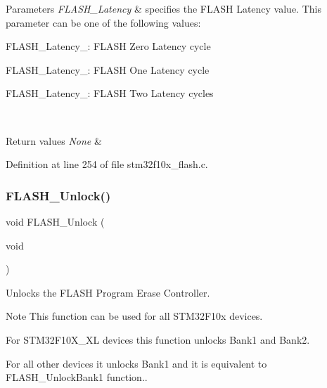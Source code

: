 \begin{DoxyParams}{Parameters}
{\em F\+L\+A\+S\+H\+\_\+\+Latency} & specifies the F\+L\+A\+SH Latency value. This parameter can be one of the following values\+: \begin{DoxyItemize}
\item F\+L\+A\+S\+H\+\_\+\+Latency\+\_\+: F\+L\+A\+SH Zero Latency cycle \item F\+L\+A\+S\+H\+\_\+\+Latency\+\_\+: F\+L\+A\+SH One Latency cycle \item F\+L\+A\+S\+H\+\_\+\+Latency\+\_\+: F\+L\+A\+SH Two Latency cycles \end{DoxyItemize}
\\
\hline
\end{DoxyParams}

\begin{DoxyRetVals}{Return values}
{\em None} & \\
\hline
\end{DoxyRetVals}


Definition at line 254 of file stm32f10x\+\_\+flash.\+c.

\mbox{\label{group___f_l_a_s_h___exported___functions_ga4084d0184bab463a1579271bf474aaef}} 
\subsubsection{\texorpdfstring{F\+L\+A\+S\+H\+\_\+\+Unlock()}{FLASH\_Unlock()}}
{\footnotesize\ttfamily void F\+L\+A\+S\+H\+\_\+\+Unlock (\begin{DoxyParamCaption}\item[{void}]{ }\end{DoxyParamCaption})}



Unlocks the F\+L\+A\+SH Program Erase Controller. 

\begin{DoxyNote}{Note}
This function can be used for all S\+T\+M32\+F10x devices.
\begin{DoxyItemize}
\item For S\+T\+M32\+F10\+X\+\_\+\+XL devices this function unlocks Bank1 and Bank2.
\item For all other devices it unlocks Bank1 and it is equivalent to F\+L\+A\+S\+H\+\_\+\+Unlock\+Bank1 function.. 
\end{DoxyItemize}
\end{DoxyNote}

